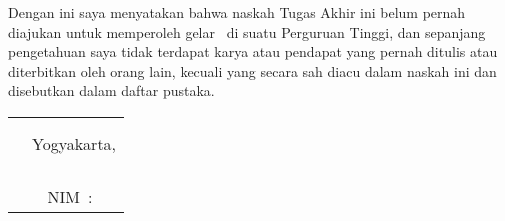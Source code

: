 \makeatletter
\let\kaprodi\@kaprodi
\let\pembimbingA\@firstsupervisor
\let\jurusan\@dept
\let\sarjana\@degree
\let\fullname\@fullname
\let\idnum\@idnum
\let\titleind\@titleind
\let\tglsetuju\@approvaldate
\let\faculty\@faculty
\makeatother


\vspace{2.5cm}

Dengan ini saya menyatakan bahwa naskah Tugas Akhir ini belum pernah diajukan untuk memperoleh gelar \sarjana~di suatu Perguruan Tinggi, dan sepanjang pengetahuan saya tidak terdapat karya atau pendapat yang pernah ditulis atau diterbitkan oleh orang lain, kecuali yang secara sah diacu dalam naskah ini dan disebutkan dalam daftar pustaka.


\begin{tabular}{p{5.7cm}l}
	&\\
	&\\
	&Yogyakarta, \tglsetuju\\
	
	&	\\
	&	\\
	&	\\
	&	\multicolumn{1}{c}{\bfseries \underline{\fullname}}\\
	& \multicolumn{1}{c}{NIM~:~\idnum}\\
\end{tabular}

